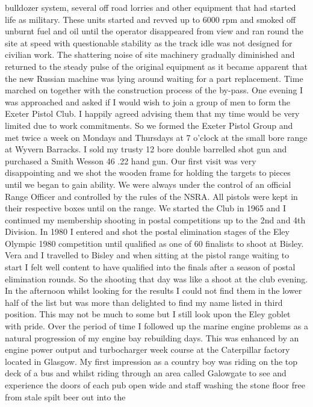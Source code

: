 bulldozer system, several off road lorries and other equipment that had started
life as military. These units started and revved up to 6000 rpm and smoked off
unburnt fuel and oil until the operator disappeared from view and ran round the
site at speed with questionable stability as the track idle was not designed
for civilian work. The shattering noise of site machinery gradually diminished
and returned to the steady pulse of the original equipment as it became
apparent that the new Russian machine was lying around waiting for a part
replacement. Time marched on together with the construction process of the
by-pass. One evening I was approached and asked if I would wish to join a group
of men to form the Exeter Pistol Club. I happily agreed advising them that my
time would be very limited due to work commitments. So we formed the Exeter
Pistol Group and met twice a week on Mondays and Thursdays at 7 o'clock at the
small bore range at Wyvern Barracks. I sold my trusty 12 bore double barrelled
shot gun and purchased a Smith Wesson 46 .22 hand gun. Our first visit was
very disappointing and we shot the wooden frame for holding the targets to
pieces until we began to gain ability. We were always under the control of an
official Range Officer and controlled by the rules of the NSRA. All pistols
were kept in their respective boxes until on the range. We started the Club in
1965 and I continued my membership shooting in postal competitions up to the
2nd and 4th Division. In 1980 I entered and shot the postal elimination stages
of the Eley Olympic 1980 competition until qualified as one of 60 finalists to
shoot at Bisley. Vera and I travelled to Bisley and when sitting at the pistol
range waiting to start I felt well content to have qualified into the finals
after a season of postal elimination rounds. So the shooting that day was like
a shoot at the club evening. In the afternoon whilst looking for the results I
could not find them in the lower half of the list but was more than delighted
to find my name listed in third position. This may not be much to some but I
still look upon the Eley goblet with pride. Over the period of time I followed
up the marine engine problems as a natural progression of my engine bay
rebuilding days. This was enhanced by an engine power output and turbocharger
week course at the Caterpillar factory located in Glasgow. My first impression
as a country boy was riding on the top deck of a bus and whilst riding through
an area called Galowgate to see and experience the doors of each pub open wide
and staff washing the stone floor free from stale spilt beer out into the
